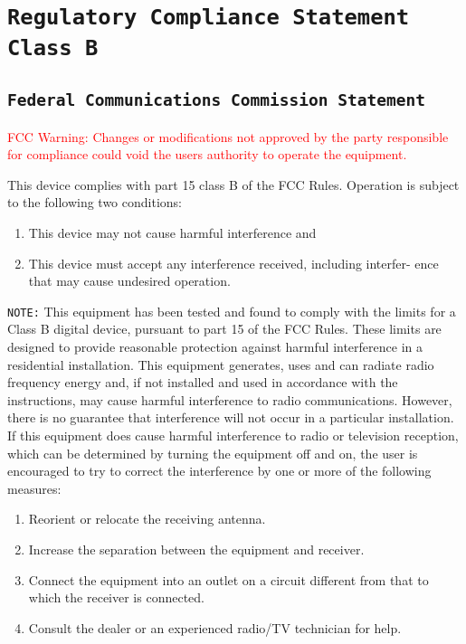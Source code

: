 %
%
%
%
%




\section{\texttt{Regulatory Compliance Statement Class B}}

\subsection{\texttt{Federal Communications Commission Statement}}

\textcolor{red}{FCC Warning:}
\textcolor{red}{Changes or modifications not approved by the party responsible for compliance could void the users authority to operate the equipment.}


This device complies with part 15 class B of the FCC Rules. Operation is
subject to the following two conditions:
\begin{enumerate}
\item This device may not cause harmful interference and
\item This device must accept any interference received, including interfer-
ence that may cause undesired operation.
\end{enumerate}


\texttt{NOTE:} This equipment has been tested and found to comply with the
limits for a Class B digital device, pursuant to part 15 of the FCC Rules.
These limits are designed to provide reasonable protection against harmful
interference in a residential installation. This equipment generates, uses
and can radiate radio frequency energy and, if not installed and used in
accordance with the instructions, may cause harmful interference to radio
communications. However, there is no guarantee that interference will not
occur in a particular installation. If this equipment does cause harmful
interference to radio or television reception, which can be determined by
turning the equipment off and on, the user is encouraged to try to correct
the interference by one or more of the following measures:
\begin{enumerate}
\item Reorient or relocate the receiving antenna.
\item Increase the separation between the equipment and receiver.
\item Connect the equipment into an outlet on a circuit different from that
to which the receiver is connected.
\item Consult the dealer or an experienced radio/TV technician for help.
\end{enumerate}

